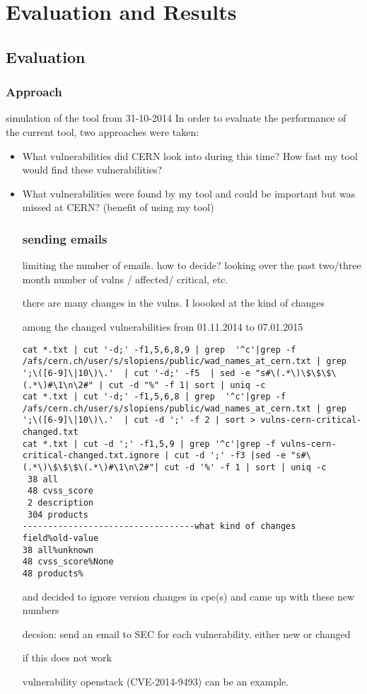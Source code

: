 \chapter{Evaluation and Results}
\label{chap6-results}
\thispagestyle{empty}

\section{Evaluation}

\subsection{Approach}
simulation of the tool from 31-10-2014 
In order to evaluate the performance of the current tool, two approaches were taken:
\begin{itemize}
\item What vulnerabilities did CERN look into during this time? How fast my tool would find these vulnerabilities?
\item What vulnerabilities were found by my tool and could be important but was missed at CERN? (benefit of using my tool)

\subsection{sending emails}
limiting the number of emails. how to decide? looking over the past two/three month
number of vulns / affected/ critical, etc.

there are many changes in the vulns. I loooked at the kind of changes 

among the changed vulnerabilities from 01.11.2014 to 07.01.2015
\begin{lstlisting}
cat *.txt | cut '-d;' -f1,5,6,8,9 | grep  '^c'|grep -f /afs/cern.ch/user/s/slopiens/public/wad_names_at_cern.txt | grep ';\([6-9]\|10\)\.'  | cut '-d;' -f5  | sed -e "s#\(.*\)\$\$\$\(.*\)#\1\n\2#" | cut -d "%" -f 1| sort | uniq -c
cat *.txt | cut '-d;' -f1,5,6,8 | grep  '^c'|grep -f /afs/cern.ch/user/s/slopiens/public/wad_names_at_cern.txt | grep ';\([6-9]\|10\)\.'  | cut -d ';' -f 2 | sort > vulns-cern-critical-changed.txt
cat *.txt | cut -d ';' -f1,5,9 | grep '^c'|grep -f vulns-cern-critical-changed.txt.ignore | cut -d ';' -f3 |sed -e "s#\(.*\)\$\$\$\(.*\)#\1\n\2#"| cut -d '%' -f 1 | sort | uniq -c
 38 all
 48 cvss_score
 2 description
 304 products
----------------------------------what kind of changes
field%old-value
38 all%unknown
48 cvss_score%None
48 products%
\end{lstlisting}

and decided to ignore version changes in cpe(s) and came up with these new numbers

decsion: send an email to SEC for each vulnerability. either new or changed


if this does not work

vulnerability openstack (CVE-2014-9493) can be an example.
\end{itemize}

